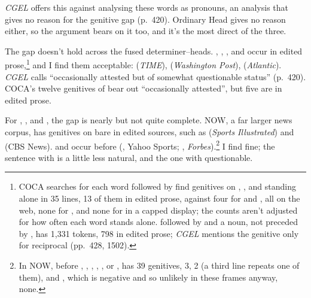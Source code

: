 \textit{CGEL} offers this against analysing these words as pronouns, an analysis that gives no reason for the genitive gap (p.~420). Ordinary Head gives no reason either, so the argument bears on it too, and it's the most direct of the three.

The gap doesn't hold across the fused determiner--heads. , , , and  occur in edited prose,\footnote{COCA searches for each word followed by  find genitives on , , and  standing alone in 35 lines, 13 of them in edited prose, against four for  and , all on the web, none for , and none for  in a capped display; the counts aren't adjusted for how often each word stands alone.  followed by  and a noun, not preceded by , has 1,331 tokens, 798 in edited prose; \textit{CGEL} mentions the genitive only for reciprocal  (pp.~428, 1502).} and I find them acceptable:  (\textit{TIME}),  (\textit{Washington Post}),  (\textit{Atlantic}). \textit{CGEL} calls  \enquote{occasionally attested but of somewhat questionable status} (p.~420). COCA's twelve genitives of  bear out \enquote{occasionally attested}, but five are in edited prose.

For , , and , the gap is nearly but not quite complete. NOW, a far larger news corpus, has genitives on bare  in edited sources, such as  (\textit{Sports Illustrated}) and  (CBS News).  and  occur before  (, Yahoo Sports; , \textit{Forbes}).\footnote{In NOW, before , , , , , or ,  has 39 genitives,  3,  2 (a third line repeats one of them), and , which is negative and so unlikely in these frames anyway, none.} I find  fine; the sentence with  is a little less natural, and the one with  questionable.

